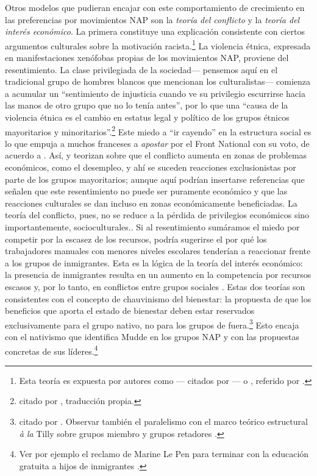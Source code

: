 Otros modelos que pudieran encajar con este comportamiento de crecimiento en las preferencias por movimientos NAP son la \textit{teoría del conflicto} y la \textit{teoría del interés económico}. La primera constituye una explicación consistente con ciertos argumentos culturales sobre la motivación racista.\footnote{Esta teoría es expuesta por autores como \textcite{Blalock67,Olzak92}--- citados por \textcite{Coffe07}---  o \textcite{Petersen02}, referido por \textcite{Beauchamp16b}.} La violencia étnica, expresada en manifestaciones xenófobas propias de los movimientos NAP, proviene del resentimiento. La clase privilegiada de la sociedad--- pensemos aquí en el tradicional grupo de hombres blancos que mencionan los culturalistas--- comienza a acumular un ``sentimiento de injusticia cuando ve su privilegio escurrirse hacia las manos de otro grupo que no lo tenía antes'', por lo que una ``causa de la violencia étnica es el cambio en estatus legal y político de los grupos étnicos mayoritarios y minoritarios''.\footnote{\textcite{Petersen02} citado por \textcite{Beauchamp16b}, traducción propia.} Este miedo a ``ir cayendo'' en la estructura social es lo que empuja a muchos franceses a \textit{apostar} por el Front National con su voto, de acuerdo a \textcite{LeBras15}. Así, \textcite{Blalock67} y \textcite{Olzak92} teorizan sobre que el conflicto aumenta en zonas de problemas económicos, como el desempleo, y ahí se suceden reacciones exclusionistas por parte de los grupos mayoritarios;{\color{Red} aunque aquí podrían insertarse referencias que señalen que este resentimiento no puede ser puramente económico y que las reacciones culturales se dan incluso en zonas económicamente beneficiadas. La teoría del conflicto, pues, no se reduce a la pérdida de privilegios económicos sino importantemente, socioculturales.}. Si al resentimiento sumáramos el miedo por competir por la escasez de los recursos, podría sugerirse el por qué los trabajadores manuales con menores niveles escolares tenderían a reaccionar frente a los grupos de inmigrantes. Esta es la lógica de la teoría del interés económico: la presencia de inmigrantes resulta en un aumento en la competencia por recursos escasos y, por lo tanto, en conflictos entre grupos sociales \parencite[144]{Coffe07}. Estas dos teorías son consistentes con el concepto de chauvinismo del bienestar: la propuesta de que los beneficios que aporta el estado de bienestar deben estar reservados exclusivamente para el grupo nativo, no para los grupos de fuera.\footnote{\textcite{Kitschelt95} citado por \textcite{Coffe07}. Observar también el paralelismo con el marco teórico estructural \textit{à la} Tilly sobre grupos miembro y grupos retadores \parencite{Skocpol79}.} Esto encaja con el nativismo que identifica Mudde en los grupos NAP \parencite{Mudde07a,Beauchamp16a} y con las propuestas concretas de sus líderes.\footnote{Ver por ejemplo el reclamo de Marine Le Pen para terminar con la educación gratuita a hijos de inmigrantes \parencite{LePen16}.}\\

